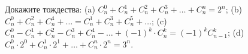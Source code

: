 Докажите тождества: (a) $C_n^0 + C_n^1 + C_n^2 + C_n^3 + \ldots + C_n^n = 2^n$; \medskip (b) $C_n^0 + C_n^2 + C_n^4 + \ldots = C_n^1 + C_n^3 + C_n^5 + \ldots$; \medskip (c) $C_n^0 - C_n^1 + C_n^2 - C_n^3 + C_n^4 - \ldots + (-1)^k \cdot C_n^k = (-1)^k C_{n-1}^k$; \medskip (d) $C_n^0 \cdot 2^0 + C_n^1 \cdot 2^1 + \ldots + C_n^n \cdot 2^n = 3^n$.